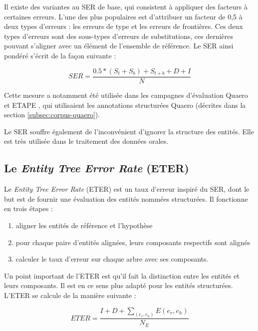 \documentclass[12pt,a4paper,times,twoside,openright]{report}
\begin{document}
Il existe des variantes au SER de base, qui consistent à appliquer des facteurs à certaines erreurs. L'une des plus populaires est d'attribuer un facteur de 0,5 à deux types d'erreurs : les erreurs de type et les erreurs de frontières. Ces deux types d'erreurs sont des sous-types d'erreurs de substitutions, ces dernières pouvant s'aligner avec un élément de l'ensemble de référence. Le SER ainsi pondéré s'écrit de la façon suivante :

\begin{equation}\label{eq:SER-weighted}
SER = \frac{0.5*(S_{t} + S_{b}) + S_{t+b} + D + I}{N}
\end{equation}

Cette mesure a notamment été utilisée dans les campagnes d'évaluation Quaero \citep{galibert2011structured} et ETAPE \citep{gravier2012etape}, qui utilisaient les annotations structurées Quaero (décrites dans la section \ref{subsec:corpus-quaero}).

Le SER souffre également de l'inconvénient d'ignorer la structure des entités. Elle est très utilisée dans le traitement des données orales.


\subsection{Le \emph{Entity Tree Error Rate} (ETER)}
\label{subsec:ETER}

Le \textit{Entity Tree Error Rate} (ETER) \citep{jannet2014eter} est un taux d'erreur inspiré du SER, dont le but est de fournir une évaluation des entités nommées structurées. Il fonctionne en trois étapes :
\begin{enumerate}
    \item aligner les entités de référence et l'hypothèse
    \item pour chaque paire d'entités alignées, leurs composants respectifs sont alignés
    \item calculer le taux d'erreur sur chaque arbre avec ses composants.
\end{enumerate}

Un point important de l'ETER est qu'il fait la distinction entre les entités et leurs composants. Il est en ce sens plus adapté pour les entités structurées. L'ETER se calcule de la manière suivante :

\begin{equation}\label{eq:ETER}
ETER = \frac{I + D + \sum_{(e_{r}, e_{h})}E(e_{r}, e_{h})}{N_{E}}
\end{equation}
\end{document}
